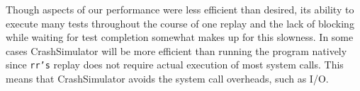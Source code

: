 Though aspects of our performance were less efficient than desired, its
ability to execute many tests throughout the course of one replay and the
lack of blocking while waiting for test completion somewhat makes up for
this slowness. In some cases CrashSimulator will be more efficient than
running the program natively since {\tt rr's} replay does not require
actual execution of most system calls.  This means that CrashSimulator
avoids the system call overheads, such as I/O.
